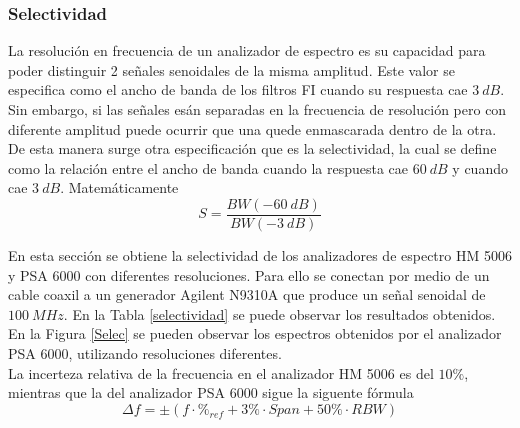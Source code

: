 \documentclass[a4paper,10pt]{article}
\begin{document}
		\subsubsection{Selectividad}
		\indent La resoluci\'on en frecuencia de un analizador de espectro es su
		capacidad para poder distinguir 2 se\~nales senoidales de la misma 
		amplitud. Este valor se especifica como el ancho de banda de los filtros
		FI cuando su respuesta cae $3~dB$. \\ 
		\indent Sin embargo, si las se\~nales es\'an separadas en la frecuencia 
		de resoluci\'on pero con diferente amplitud puede ocurrir que una quede 
		enmascarada dentro de la otra. De esta manera surge otra 
		especificaci\'on que es la selectividad, la cual se define como la 
		relaci\'on entre el ancho de banda cuando la respuesta cae $60~dB$ y 
		cuando cae $3~dB$. Matem\'aticamente 
		$$S=\frac{BW(-60~dB)}{BW(-3~dB)}$$
	
		\indent En esta secci\'on se obtiene la selectividad de los analizadores
		de espectro HM 5006 y PSA 6000 con diferentes resoluciones. Para ello se
		conectan por medio de un cable coaxil a un generador Agilent N9310A que 
		produce un se\~nal senoidal de $100~MHz$. En la Tabla \ref{selectividad}
		se puede observar los resultados obtenidos. En la Figura \ref{Selec} se 
		pueden observar los espectros obtenidos por el analizador PSA 6000, 
		utilizando resoluciones diferentes. \\
		\indent La incerteza relativa de la frecuencia en el analizador HM 5006 
		es del $10\%$, mientras que la  del analizador PSA 6000 sigue la 
		siguente f\'ormula
		$$\Delta f=\pm\left(f\cdot \%_{ref} +3\%\cdot Span+50\%\cdot RBW \right)$$
		
		
\end{document}
